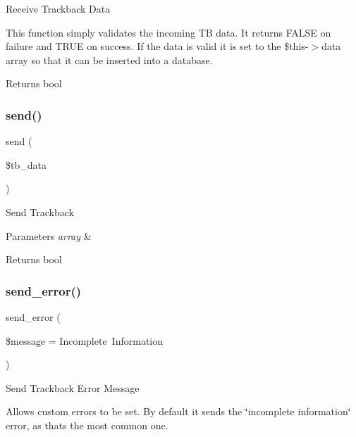 Receive Trackback Data

This function simply validates the incoming TB data. It returns F\+A\+L\+SE on failure and T\+R\+UE on success. If the data is valid it is set to the \$this-\/$>$data array so that it can be inserted into a database.

\begin{DoxyReturn}{Returns}
bool 
\end{DoxyReturn}
\mbox{\label{class_c_i___trackback_a4ee54341ef16e67ca033704f4373a56b}} 
\subsubsection{\texorpdfstring{send()}{send()}}
{\footnotesize\ttfamily send (\begin{DoxyParamCaption}\item[{}]{\$tb\+\_\+data }\end{DoxyParamCaption})}

Send Trackback


\begin{DoxyParams}{Parameters}
{\em array} & \\
\hline
\end{DoxyParams}
\begin{DoxyReturn}{Returns}
bool 
\end{DoxyReturn}
\mbox{\label{class_c_i___trackback_a1d4188b1ba4d71ad5392bee635102e87}} 
\subsubsection{\texorpdfstring{send\+\_\+error()}{send\_error()}}
{\footnotesize\ttfamily send\+\_\+error (\begin{DoxyParamCaption}\item[{}]{\$message = {\ttfamily \textquotesingle{}Incomplete~Information\textquotesingle{}} }\end{DoxyParamCaption})}

Send Trackback Error Message

Allows custom errors to be set. By default it sends the \char`\"{}incomplete information\char`\"{} error, as that\textquotesingle{}s the most common one.


